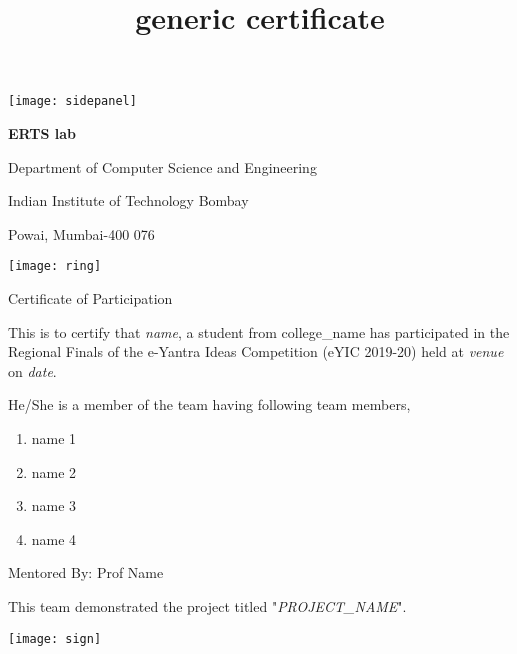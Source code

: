 \documentclass[a4paper,12pt]{article}
\title{generic certificate}
\begin{document}

\begin{minipage}{0.18\linewidth}
    \texttt{[image: sidepanel]}
\end{minipage}
\begin{minipage}{0.78\linewidth}
    \textbf{ERTS lab}\par
    Department of Computer Science and Engineering\par
    Indian Institute of Technology Bombay\par
    Powai, Mumbai-400 076\par\vspace{10pt}
    \texttt{[image: ring]}\par
    \Large{Certificate of Participation}\par\vspace{15pt}
    \normalsize{This is to certify that {\color{blue}\textit{name}}, a student from college\_name has participated in the Regional Finals of the e-Yantra Ideas Competition (eYIC 2019-20) held at {\color{blue}\textit{venue}} on {\color{blue}\textit{date}}.}\par\vspace{15pt}
    \normalsize{He/She is a member of the team having following team members,}\par
    \begin{enumerate}[topsep=0pt,itemsep=2pt,parsep=2pt]
        \item name 1
        \item name 2
        \item name 3
        \item name 4
    \end{enumerate}
    Mentored By: Prof Name\par\vspace{15pt}
    This team demonstrated the project titled "{\color{blue}\textit{PROJECT\_NAME}}".\par\vspace{20pt}
    \begin{minipage}{0.7\linewidth}
        \hspace{10pt}
        \texttt{[image: sign]}\par
\end{minipage}
\end{minipage}
\end{document}
